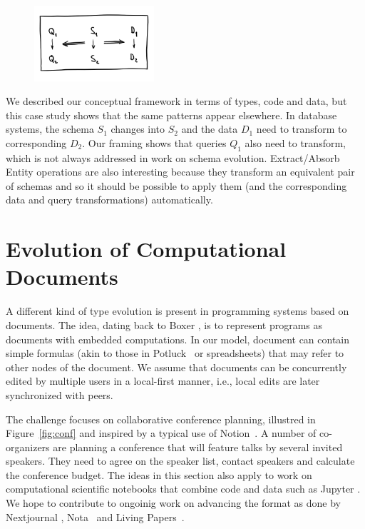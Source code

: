 \documentclass[english,submission]{programming}
\DeclareRobustCommand{\frameworkbox}[1]{\leftbar#1\endleftbar}
\newcommand{\frameworkboxtitle}[1]{\noindent{\firamedium #1.}\quad}
\begin{document}
\frameworkbox{
\begin{figure}
\vspace{-0.5em}
\includegraphics[width=12em]{figures/arr-db.png}
\vspace{-1em}
\end{figure}
\frameworkboxtitle{Equivalence in Schema Evolution}
We described our conceptual framework in terms of types, code and data, but this case
study shows that the same patterns appear elsewhere. In database systems, the schema
$S_1$ changes into $S_2$ and the data $D_1$ need to transform to corresponding $D_2$.
Our framing shows that queries $Q_1$ also need to transform, which is not always addressed
in work on schema evolution. Extract/Absorb Entity operations are also interesting because
they transform an equivalent pair of schemas and so it should be possible to apply them
(and the corresponding data and query transformations) automatically.
}


\section{Evolution of Computational Documents}
A different kind of type evolution is present in programming systems based on documents.
The idea, dating back to Boxer \cite{diSessa86}, is to represent programs as documents
with embedded computations. In our model, document can contain simple formulas (akin to those
in Potluck~\cite{Litt2023} or spreadsheets) that may refer to other nodes of the document.
We assume that documents can be concurrently edited by multiple users in a local-first manner,
i.e., local edits are later synchronized with peers.

The challenge focuses on collaborative conference planning, illustred in Figure~\ref{fig:conf}
and inspired by a typical use of Notion~\cite{notion}. A number of co-organizers are planning
a conference that will feature talks by several invited speakers. They need to agree on the
speaker list, contact speakers and calculate the conference budget.
%
The ideas in this section also apply to work on computational scientific notebooks
that combine code and data such as Jupyter \cite{Kluyver2016}. We hope to contribute to ongoinig
work on advancing the format as done by Nextjournal \cite{Nextjournal21}, Nota~\cite{Crichton2021}
and Living Papers~\cite{Heer2023}.
\end{document}

